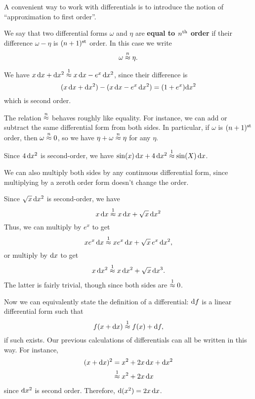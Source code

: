 \documentclass[12pt]{amsart}
\begin{document}
A convenient way to work with differentials is to introduce the notion of ``approximation to first order''.

\begin{defn}
  We say that two differential forms $\omega$ and $\eta$ are \textbf{equal to $n^{\mathrm{th}}$ order} if their difference $\omega-\eta$ is $(n+1)^{\mathrm{st}}$ order.
  In this case we write
  \[\omega\mathrel{\overset{n}{\approx}} \eta.\]
\end{defn}

\begin{eg}
  We have $x\,\mathrm{d} x + \mathrm{d} x^2 \mathrel{\overset{1}{\approx}} x\,\mathrm{d} x - e^x \,\mathrm{d} x^2$, since their difference is
  \[ (x\,\mathrm{d} x + \mathrm{d} x^2) - (x\,\mathrm{d} x - e^x\, \mathrm{d} x^2) = (1+e^x)\mathrm{d} x^2 \]
  which is second order.
\end{eg}

The relation $\mathrel{\overset{n}{\approx}}$ behaves roughly like equality.
For instance, we can add or subtract the same differential form from both sides.
In particular, if $\omega$ is $(n+1)^{\mathrm{st}}$ order, then $\omega\mathrel{\overset{n}{\approx}}0$, so we have $\eta + \omega \mathrel{\overset{n}{\approx}} \eta$ for any $\eta$.

\begin{eg}
  Since $4\,\mathrm{d} x^2$ is second-order, we have $\sin(x) \,\mathrm{d} x + 4\, \mathrm{d} x^2 \mathrel{\overset{1}{\approx}} \sin(X)\,\mathrm{d} x$.
\end{eg}

We can also multiply both sides by any continuous differential form, since multiplying by a zeroth order form doesn't change the order.

\begin{eg}
  Since $\sqrt{x}\, \mathrm{d} x^2$ is second-order, we have
  \[x\,\mathrm{d} x \mathrel{\overset{1}{\approx}} x\,\mathrm{d} x + \sqrt{x}\, \mathrm{d} x^2\]
  Thus, we can multiply by $e^x$ to get
  \[x e^x \,\mathrm{d} x \mathrel{\overset{1}{\approx}} x e^x\,\mathrm{d} x + \sqrt{x}\, e^x\, \mathrm{d} x^2,\]
  or multiply by $\mathrm{d} x$ to get
  \[x\,\mathrm{d} x^2 \mathrel{\overset{1}{\approx}} x\,\mathrm{d} x^2 + \sqrt{x} \,\mathrm{d} x^3. \]
  The latter is fairly trivial, though since both sides are $\mathrel{\overset{1}{\approx}} 0$.
\end{eg}

Now we can equivalently state the definition of a differential: $\mathrm{d} f$ is a linear differential form such that
\[ f(x+\mathrm{d} x) \mathrel{\overset{1}{\approx}} f(x) + \mathrm{d} f, \]
if such exists.
Our previous calculations of differentials can all be written in this way.
For instance,
\begin{align*}
  (x+\mathrm{d} x)^2 &= x^2 + 2 x\,\mathrm{d} x + \mathrm{d} x^2\\
  &\mathrel{\overset{1}{\approx}} x^2 + 2 x\,\mathrm{d} x
\end{align*}
since $\mathrm{d} x^2$ is second order.
Therefore, $\mathrm{d}(x^2) = 2x\,\mathrm{d} x$.

\end{document}
